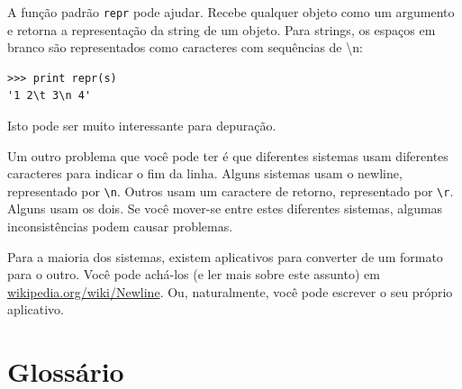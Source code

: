 
A função padrão {\tt repr} pode ajudar. Recebe qualquer objeto como um
argumento e retorna a representação da string de um objeto. Para strings,
os espaços em branco são representados como caracteres com sequências
de \textbackslash n:

\beforeverb
\begin{verbatim}
>>> print repr(s)
'1 2\t 3\n 4'
\end{verbatim}
\afterverb

Isto pode ser muito interessante para depuração.

Um outro problema que você pode ter é que diferentes sistemas
usam diferentes caracteres para indicar o fim da linha. Alguns
sistemas usam o newline, representado por \verb"\n". Outros usam
um caractere de retorno, representado por \verb"\r". Alguns usam os
dois. Se você mover-se entre estes diferentes sistemas, algumas 
inconsistências podem causar problemas.


Para a maioria dos sistemas, existem aplicativos para converter
de um formato para o outro. Você pode achá-los (e ler mais sobre
este assunto) em \url{wikipedia.org/wiki/Newline}. Ou, naturalmente,
você pode escrever o seu próprio aplicativo.


\section{Glossário}

